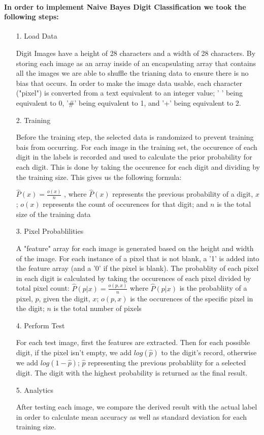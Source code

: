 \documentclass[12pt]{article}
\begin{document}
\paragraph{In order to implement Naive Bayes Digit Classification we took the following steps:}
\begin{itemize}
    \item[1.] Load Data
    \item[] Digit Images have a height of 28 characters and a width of 28 characters. By storing each image as an array inside of an encapsulating array that contains all the images we are able to shuffle the trianing data to ensure there is no bias that occurs. In order to make the image data usable, each character ("pixel") is converted from a text equivalent to an integer value; ' ' being equivalent to 0, '\#' being equivalent to 1, and '+' being equivalent to 2.
    \item[2.] Training 
    \item[] Before the training step, the selected data is randomized to prevent training bais from occurring. For each image in the training set, the occurence of each digit in the labels is recorded and used to calculate the prior probability for each digit. This is done by taking the occurence for each digit and dividing by the training size. This gives us the following formula:
    \item[] $\hat{P}(x) = \frac{o(x)}{n}$ , where $\hat{P}(x)$ represents the previous probability of a digit, $x$; $o(x)$ represents the count of occurences for that digit; and $n$ is the total size of the training data
    \item[3.] Pixel Probablilities
    \item[] A "feature" array for each image is generated based on the height and width of the image. For each instance of a pixel that is not blank, a '1' is added into the feature array (and a '0' if the pixel is blank). The probablity of each pixel in each digit is calculated by taking the occurences of each pixel divided by total pixel count: $\hat{P}(p|x) = \frac{o(p, x)}{n}$ where $\hat{P}(p|x)$ is the probabliity of a pixel, $p$, given the digit, $x$; $o(p, x)$ is the occurences of the specific pixel in the digit; $n$ is the total number of pixels
    \item[4.] Perform Test
    \item[] For each test image, first the features are extracted. Then for each possible digit, if the pixel isn't empty, we add $log(\hat{p})$ to the digit's record, otherwise we add $log(1 - \hat{p})$; $\hat{p}$ representing the previous probabliity for a selected digit. The digit with the highest probability is returned as the final result.
    \item[5.] Analytics
    \item[] After testing each image, we compare the derived result with the actual label in order to calculate mean accuracy as well as standard deviation for each training size. 
\end{itemize}
\end{document}
